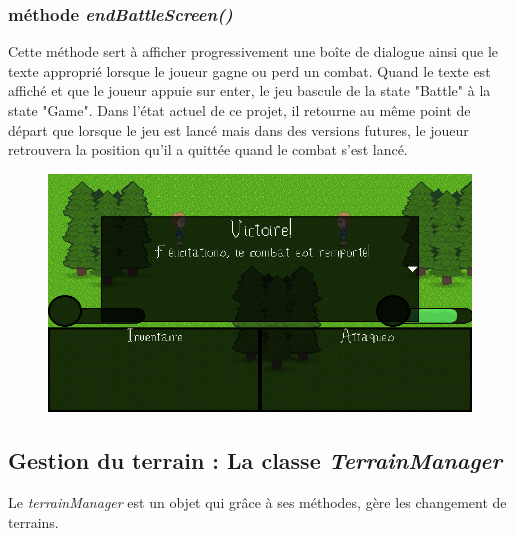 \documentclass[11pt]{article}
\begin{document}
\subsubsection{méthode \textit{endBattleScreen()}}
Cette méthode sert à afficher progressivement une boîte de dialogue ainsi que le texte approprié lorsque le joueur gagne ou perd un combat. Quand le texte est affiché et que le joueur appuie sur enter, le jeu bascule de la state "Battle" à la state "Game". Dans l'état actuel de ce projet, il retourne au même point de départ que lorsque le jeu est lancé mais dans des versions futures, le joueur retrouvera la position qu'il a quittée quand le combat s'est lancé.\\
\begin{figure}[H]
\includegraphics[scale=0.35]{victoire}
\centering
\end{figure}
\subsection{Gestion du terrain : La classe \textit{TerrainManager}}
Le \textit{terrainManager} est un objet qui grâce à ses méthodes, gère les changement de terrains.
\end{document}
